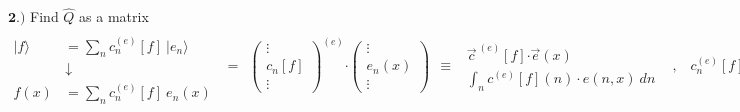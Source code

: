 \documentclass[12pt]{article}
\newcommand{\hs}{\hspace{1pt}} %
\newcommand{\dotP}{\boldsymbol \cdot}		%
\begin{document}
\vspace{15pt} \noindent
\(\boldsymbol{2.)}\) Find \(\widehat{Q}\) as a matrix\\[5pt]
\( \displaystyle
    \begin{aligned}
        \\[-8pt]
        | f \rangle & = \sum_n c_n^{(e)}{\scriptstyle[f]} \ \big| e_n \big\rangle \\[-8pt]
        & \hs \downarrow \\[-4pt]
        f {\scriptstyle(x)} & = \sum_n c_n^{(e)}{\scriptstyle[f]} \ e_n{\scriptstyle(x)} 
    \end{aligned}
    \ \ = \ \ 
    \left( \begin{matrix} 
        \vdots\\
        c_n{\scriptstyle[f]}\\
        \vdots
    \end{matrix} \right)^{(e)} \dotP
    \left( \begin{matrix} 
        \vdots\\
        e_n{\scriptstyle(x)}\\
        \vdots
    \end{matrix} \right)
    \ \ \equiv \ \
    \boxed{ \begin{gathered}
        \vec{c}^{\ (e)}{\scriptstyle[f]} \dotP \vec{e}{\scriptstyle(x)} \\[5pt]
        \int_n c^{(e)}{\scriptstyle[f]}{\scriptstyle(n)} \cdot e{\scriptstyle(n, x)} \ dn
    \end{gathered} } 
    \hspace{10pt} , \hspace{10pt}
    \boxed{ c_n^{(e)}{\scriptstyle[f]} = \langle e_n | f \rangle }
\)
\end{document}
